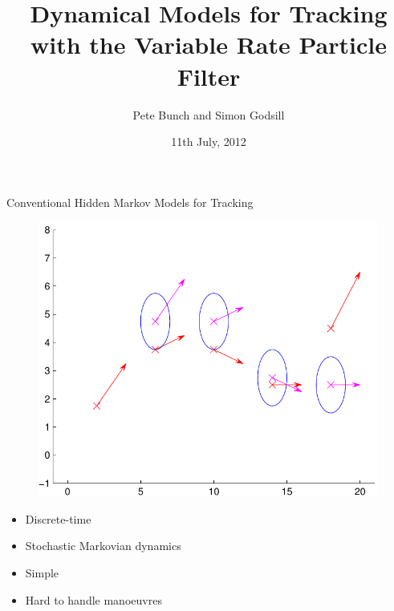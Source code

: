 \documentclass{beamer}
\title[Variable Rate Tracking]{Dynamical Models for Tracking with the Variable Rate Particle Filter}
\author[P. Bunch \& S. Godsill]{Pete Bunch and Simon Godsill}
\institute[CUED SigProC]{Cambridge University Engineering Department\\ Signal Processing \& Communications Lab}
\date{11th July, 2012}
\begin{document}
\begin{frame}
\titlepage
\end{frame}

\begin{frame}{Conventional Hidden Markov Models for Tracking}
\begin{figure}\centering\includegraphics[scale=0.5]{HMM_model.pdf}\end{figure}
\begin{itemize}
  \item Discrete-time
  \item Stochastic Markovian dynamics
  \item Simple
  \item Hard to handle manoeuvres
\end{itemize}
\end{frame}
\end{document}
